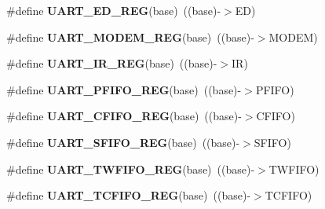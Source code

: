 \begin{DoxyCompactItemize}
\item 
\#define {\bfseries U\+A\+R\+T\+\_\+\+E\+D\+\_\+\+R\+EG}(base)~((base)-\/$>$ED)\hypertarget{group__UART__Register__Accessor__Macros_ga746dde7932b502b7a75bcc8100a7c750}{}\label{group__UART__Register__Accessor__Macros_ga746dde7932b502b7a75bcc8100a7c750}

\item 
\#define {\bfseries U\+A\+R\+T\+\_\+\+M\+O\+D\+E\+M\+\_\+\+R\+EG}(base)~((base)-\/$>$M\+O\+D\+EM)\hypertarget{group__UART__Register__Accessor__Macros_gaec51e80282719077408dac4dfc3d0ade}{}\label{group__UART__Register__Accessor__Macros_gaec51e80282719077408dac4dfc3d0ade}

\item 
\#define {\bfseries U\+A\+R\+T\+\_\+\+I\+R\+\_\+\+R\+EG}(base)~((base)-\/$>$IR)\hypertarget{group__UART__Register__Accessor__Macros_ga62976343fb3a729419dedc862e71341f}{}\label{group__UART__Register__Accessor__Macros_ga62976343fb3a729419dedc862e71341f}

\item 
\#define {\bfseries U\+A\+R\+T\+\_\+\+P\+F\+I\+F\+O\+\_\+\+R\+EG}(base)~((base)-\/$>$P\+F\+I\+FO)\hypertarget{group__UART__Register__Accessor__Macros_ga0a3d43cb2d3a60682bae6bd0380b5c48}{}\label{group__UART__Register__Accessor__Macros_ga0a3d43cb2d3a60682bae6bd0380b5c48}

\item 
\#define {\bfseries U\+A\+R\+T\+\_\+\+C\+F\+I\+F\+O\+\_\+\+R\+EG}(base)~((base)-\/$>$C\+F\+I\+FO)\hypertarget{group__UART__Register__Accessor__Macros_ga6b3e1791bd0636f6b0476b2031b35e9b}{}\label{group__UART__Register__Accessor__Macros_ga6b3e1791bd0636f6b0476b2031b35e9b}

\item 
\#define {\bfseries U\+A\+R\+T\+\_\+\+S\+F\+I\+F\+O\+\_\+\+R\+EG}(base)~((base)-\/$>$S\+F\+I\+FO)\hypertarget{group__UART__Register__Accessor__Macros_ga9944b8403a727f616325aa3cd807c00e}{}\label{group__UART__Register__Accessor__Macros_ga9944b8403a727f616325aa3cd807c00e}

\item 
\#define {\bfseries U\+A\+R\+T\+\_\+\+T\+W\+F\+I\+F\+O\+\_\+\+R\+EG}(base)~((base)-\/$>$T\+W\+F\+I\+FO)\hypertarget{group__UART__Register__Accessor__Macros_ga0c8f0b867baf783c1e07ce608fa1dac6}{}\label{group__UART__Register__Accessor__Macros_ga0c8f0b867baf783c1e07ce608fa1dac6}

\item 
\#define {\bfseries U\+A\+R\+T\+\_\+\+T\+C\+F\+I\+F\+O\+\_\+\+R\+EG}(base)~((base)-\/$>$T\+C\+F\+I\+FO)\hypertarget{group__UART__Register__Accessor__Macros_ga5d597a97bb96581bc97287b6f98e2480}{}\label{group__UART__Register__Accessor__Macros_ga5d597a97bb96581bc97287b6f98e2480}


\end{DoxyCompactItemize}
